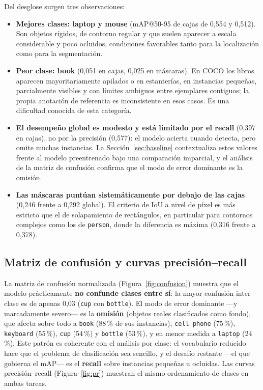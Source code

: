 \documentclass[11pt,a4paper]{article}
\begin{document}
Del desglose surgen tres observaciones:

\begin{itemize}
  \item \textbf{Mejores clases: laptop y mouse} (mAP@50-95 de cajas de 0,554 y
  0,512). Son objetos rígidos, de contorno regular y que suelen aparecer a
  escala considerable y poco ocluidos, condiciones favorables tanto para la
  localización como para la segmentación.
  \item \textbf{Peor clase: book} (0,051 en cajas, 0,025 en máscaras). En
  COCO los libros aparecen mayoritariamente apilados o en estanterías, en
  instancias pequeñas, parcialmente visibles y con límites ambiguos entre
  ejemplares contiguos; la propia anotación de referencia es inconsistente en
  esos casos. Es una dificultad conocida de esta categoría.
  \item \textbf{El desempeño global es modesto y está limitado por el recall}
  (0,397 en cajas), no por la precisión (0,577): el modelo acierta cuando
  detecta, pero omite muchas instancias. La Sección~\ref{sec:baseline}
  contextualiza estos valores frente al modelo preentrenado bajo una comparación
  imparcial, y el análisis de la matriz de confusión confirma que el modo de
  error dominante es la omisión.
  \item \textbf{Las máscaras puntúan sistemáticamente por debajo de las
  cajas} (0,246 frente a 0,292 global). El criterio de IoU a nivel de píxel
  es más estricto que el de solapamiento de rectángulos, en particular para
  contornos complejos como los de \texttt{person}, donde la diferencia es
  máxima (0,316 frente a 0,378).
\end{itemize}

\subsection{Matriz de confusión y curvas precisión--recall}

La matriz de confusión normalizada (Figura~\ref{fig:confusion}) muestra que el
modelo prácticamente \textbf{no confunde clases entre sí}: la mayor confusión
inter-clase es de apenas 0,03 (\texttt{cup} con \texttt{bottle}). El modo de
error dominante ---y marcadamente severo--- es la \textbf{omisión} (objetos
reales clasificados como fondo), que afecta sobre todo a \texttt{book} (88\,\%
de sus instancias), \texttt{cell phone} (75\,\%), \texttt{keyboard} (55\,\%),
\texttt{cup} (54\,\%) y \texttt{bottle} (53\,\%), y en menor medida a
\texttt{laptop} (24\,\%). Este patrón es coherente con el análisis por clase:
el vocabulario reducido hace que el problema de clasificación sea sencillo, y
el desafío restante ---el que gobierna el mAP--- es el \textbf{recall} sobre
instancias pequeñas u ocluidas. Las curvas precisión--recall
(Figura~\ref{fig:pr}) muestran el mismo ordenamiento de clases en ambas tareas.
\end{document}

